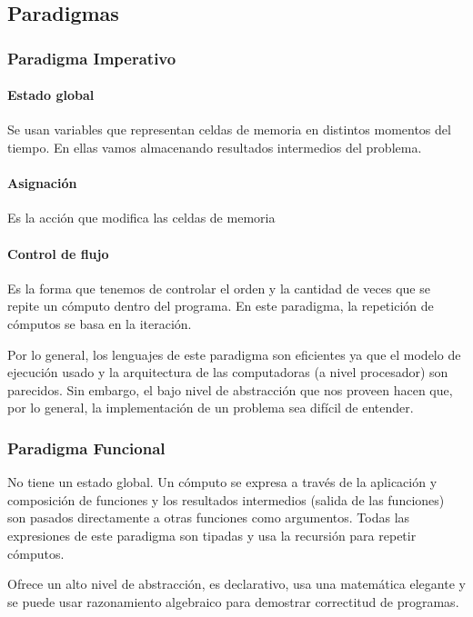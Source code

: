 \subsection{Paradigmas}
\subsubsection{Paradigma Imperativo}

\paragraph{Estado global} Se usan variables que representan celdas de memoria en distintos momentos del tiempo. En ellas vamos almacenando resultados intermedios del problema.

\paragraph{Asignación} Es la acción que modifica las celdas de memoria

\paragraph{Control de flujo} Es la forma que tenemos de controlar el orden y la cantidad de veces que se repite un cómputo dentro del programa. En este paradigma, la repetición de cómputos se basa en la iteración.

\vspace*{5mm}

Por lo general, los lenguajes de este paradigma son eficientes ya que el modelo de ejecución usado y la arquitectura de las computadoras (a nivel procesador) son parecidos. Sin embargo, el bajo nivel de abstracción que nos proveen hacen que, por lo general, la implementación de un problema sea difícil de entender.

\subsubsection{Paradigma Funcional}
No tiene un estado global. Un cómputo se expresa a través de la aplicación y composición de funciones y los resultados intermedios (salida de las funciones) son pasados directamente a otras funciones como argumentos. Todas las expresiones de este paradigma son tipadas y usa la recursión para repetir cómputos.

Ofrece un alto nivel de abstracción, es declarativo, usa una matemática elegante y se puede usar razonamiento algebraico para demostrar correctitud de programas.


